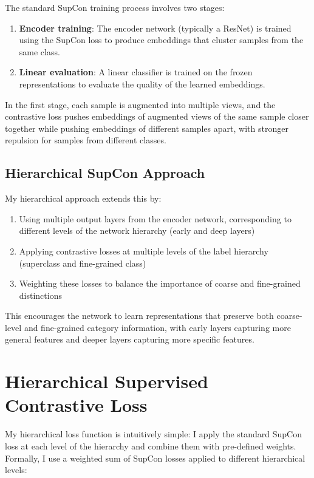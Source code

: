 \documentclass[10pt,a4paper]{article}
\begin{document}
The standard SupCon training process involves two stages:
\begin{enumerate}
    \item \textbf{Encoder training}: The encoder network (typically a ResNet) is trained using the SupCon loss to produce embeddings that cluster samples from the same class.
    \item \textbf{Linear evaluation}: A linear classifier is trained on the frozen representations to evaluate the quality of the learned embeddings.
\end{enumerate}

In the first stage, each sample is augmented into multiple views, and the contrastive loss pushes embeddings of augmented views of the same sample closer together while pushing embeddings of different samples apart, with stronger repulsion for samples from different classes.

\subsection{Hierarchical SupCon Approach}

My hierarchical approach extends this by:
\begin{enumerate}
    \item Using multiple output layers from the encoder network, corresponding to different levels of the network hierarchy (early and deep layers)
    \item Applying contrastive losses at multiple levels of the label hierarchy (superclass and fine-grained class)
    \item Weighting these losses to balance the importance of coarse and fine-grained distinctions
\end{enumerate}

This encourages the network to learn representations that preserve both coarse-level and fine-grained category information, with early layers capturing more general features and deeper layers capturing more specific features.

\section{Hierarchical Supervised Contrastive Loss}

My hierarchical loss function is intuitively simple: I apply the standard SupCon loss at each level of the hierarchy and combine them with pre-defined weights. Formally, I use a weighted sum of SupCon losses applied to different hierarchical levels:
\end{document}
